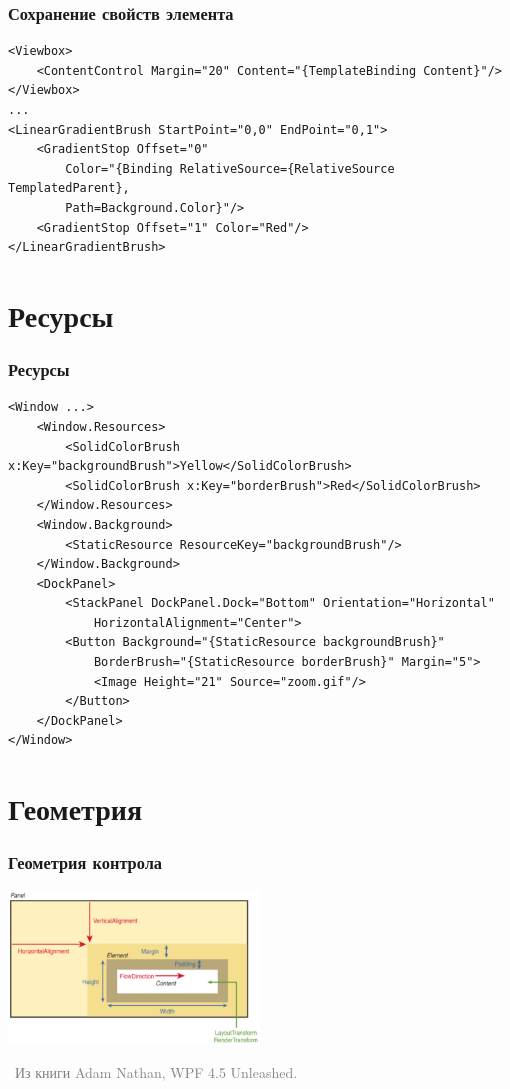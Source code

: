 \documentclass[xetex,mathserif,serif]{beamer}
\newcommand{\attribution}[1] {
\vspace{-5mm}\begin{flushright}\begin{scriptsize}\textcolor{gray}{\textcopyright\, #1}\end{scriptsize}\end{flushright}
}
\begin{document}
	\begin{frame}[fragile]
		\frametitle{Сохранение свойств элемента}
		\begin{scriptsize}
			\begin{verbatim}
<Viewbox>
    <ContentControl Margin="20" Content="{TemplateBinding Content}"/>
</Viewbox>
...
<LinearGradientBrush StartPoint="0,0" EndPoint="0,1">
    <GradientStop Offset="0"
        Color="{Binding RelativeSource={RelativeSource TemplatedParent},
        Path=Background.Color}"/>
    <GradientStop Offset="1" Color="Red"/>
</LinearGradientBrush>
			\end{verbatim}
		\end{scriptsize}
	\end{frame}

	\section{Ресурсы}

	\begin{frame}[fragile]
		\frametitle{Ресурсы}
		\begin{scriptsize}
			\begin{verbatim}
<Window ...>
    <Window.Resources>
        <SolidColorBrush x:Key="backgroundBrush">Yellow</SolidColorBrush>
        <SolidColorBrush x:Key="borderBrush">Red</SolidColorBrush>
    </Window.Resources>
    <Window.Background>
        <StaticResource ResourceKey="backgroundBrush"/>
    </Window.Background>
    <DockPanel>
        <StackPanel DockPanel.Dock="Bottom" Orientation="Horizontal"
            HorizontalAlignment="Center">
        <Button Background="{StaticResource backgroundBrush}"
            BorderBrush="{StaticResource borderBrush}" Margin="5">
            <Image Height="21" Source="zoom.gif"/>
        </Button>
    </DockPanel>
</Window>
			\end{verbatim}
		\end{scriptsize}
	\end{frame}

	\section{Геометрия}

	\begin{frame}
		\frametitle{Геометрия контрола}
		\begin{center}
			\includegraphics[width=0.5\textwidth]{controlGeometry.png}
		\end{center}
		\attribution{Из книги Adam Nathan, WPF 4.5 Unleashed.}
	\end{frame}
\end{document}
